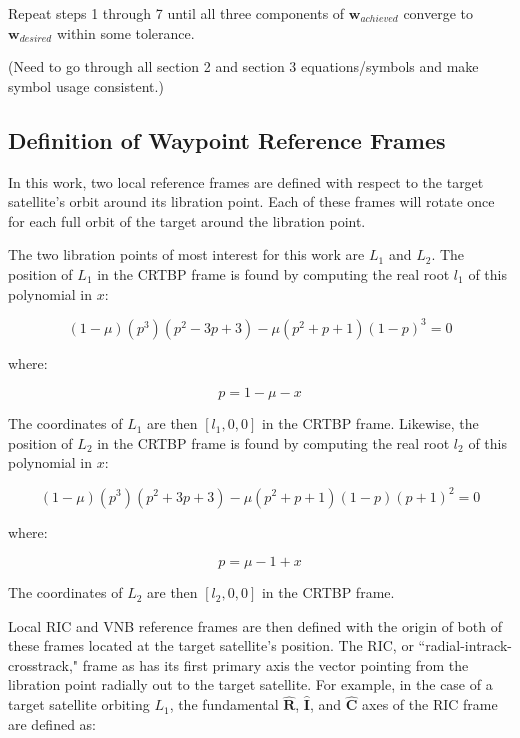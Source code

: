 \documentclass[]{article}
\begin{document}
Repeat steps 1 through 7 until all three components of \(\mathbf{w}_{achieved}\) converge to \(\mathbf{w}_{desired}\) within some tolerance.

(Need to go through all section 2 and section 3 equations/symbols and make symbol usage consistent.)

\subsection{Definition of Waypoint Reference Frames}

In this work, two local reference frames are defined with respect to the target satellite's orbit around its libration point.  Each of these frames will rotate once for each full orbit of the target around the libration point.

The two libration points of most interest for this work are \(L_1\) and \(L_2\).  The position of \(L_1\) in the CRTBP frame is found by computing the real root \(l_1\) of this polynomial in \(x\):

\begin{equation} \label{eq:L1}
(1 - \mu)(p^3)(p^2 - 3p + 3) - \mu(p^2 + p + 1)(1 - p)^3 = 0
\end{equation}

where:

\begin{equation*}
p = 1 - \mu - x
\end{equation*}

The coordinates of \(L_1\) are then \([l_1, 0, 0]\) in the CRTBP frame.  Likewise, the position of \(L_2\) in the CRTBP frame is found by computing the real root \(l_2\) of this polynomial in \(x\):

\begin{equation} \label{eq:L2}
(1 - \mu)(p^3)(p^2 + 3p + 3) - \mu(p^2 + p + 1)(1 - p)(p + 1)^2 = 0
\end{equation}

where:

\begin{equation*}
p = \mu - 1 + x
\end{equation*}

The coordinates of \(L_2\) are then \([l_2, 0, 0]\) in the CRTBP frame.

Local RIC and VNB reference frames are then defined with the origin of both of these frames located at the target satellite's position.  The RIC, or ``radial-intrack-crosstrack," frame as has its first primary axis the vector pointing from the libration point radially out to the target satellite.  For example, in the case of a target satellite orbiting \(L_1\), the fundamental \(\mathbf{\hat{R}}\), \(\mathbf{\hat{I}}\), and \(\mathbf{\hat{C}}\) axes of the RIC frame are defined as:
\end{document}
